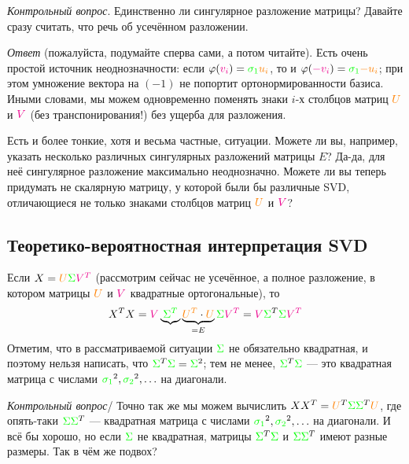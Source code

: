 \documentclass{amsart}
\theoremstyle{definition}
\theoremstyle{remark}
\numberwithin{equation}{section}
\begin{document}
\textit{Контрольный вопрос}. Единственно ли сингулярное разложение матрицы? Давайте сразу считать, что речь об усечённом разложении.

\textit{Ответ} (пожалуйста, подумайте сперва сами, а потом читайте). Есть очень простой источник неоднозначности: если $\varphi(\textcolor{magenta}{v_i}) = \textcolor{green}{\sigma_1}\textcolor{orange}{u_i}$, то и $\varphi(\textcolor{magenta}{-v_i}) = \textcolor{green}{\sigma_1}\textcolor{orange}{-u_i}$; при этом умножение вектора на $(-1)$ не попортит ортонормированности базиса. Иными словами, мы можем одновременно поменять знаки $i$-х столбцов матриц $\textcolor{orange}{U}$ и $\textcolor{magenta}{V}$ (без транспонирования!) без ущерба для разложения.

Есть и более тонкие, хотя и весьма частные, ситуации. Можете ли вы, например, указать несколько различных сингулярных разложений матрицы $E$? Да-да, для неё сингулярное разложение максимально неоднозначно. Можете ли вы теперь придумать не скалярную матрицу, у которой были бы различные SVD, отличающиеся не только знаками столбцов матриц $\textcolor{orange}{U}$ и $\textcolor{magenta}{V}$?

\subsection{Теоретико-вероятностная интерпретация SVD} Если $X =\textcolor{orange}{U}\textcolor{green}{\Sigma} \textcolor{magenta}{V^T}$ (рассмотрим сейчас не усечённое, а полное разложение, в котором матрицы $\textcolor{orange}{U}$ и $\textcolor{magenta}{V}$ квадратные ортогональные), то 
$$X^TX = \textcolor{magenta}{V}\underbrace{\textcolor{green}{\Sigma^T}}\underbrace{\textcolor{orange}{U^T}\cdot \textcolor{orange}{U}}_{=E}\textcolor{green}{\Sigma} \textcolor{magenta}{V^T} =
\textcolor{magenta}{V}\textcolor{green}{\Sigma}^T\textcolor{green}{\Sigma} \textcolor{magenta}{V^T}$$
Отметим, что в рассматриваемой ситуации $\textcolor{green}{\Sigma}$ не обязательно квадратная, и поэтому нельзя написать, что $\textcolor{green}{\Sigma}^T\textcolor{green}{\Sigma}=\textcolor{green}{\Sigma}^2$; тем не менее, $\textcolor{green}{\Sigma}^T\textcolor{green}{\Sigma}$ --- это квадратная матрица с числами $\textcolor{green}{\sigma_1}^2,\textcolor{green}{\sigma_2}^2,\ldots$ на диагонали.

\medskip

\textit{Контрольный вопрос}/ Точно так же мы можем вычислить $XX^T = \textcolor{orange}{U}^T\textcolor{green}{\Sigma}\textcolor{green}{\Sigma}^T\textcolor{orange}{U}$, где опять-таки $\textcolor{green}{\Sigma}\textcolor{green}{\Sigma}^T$ --- квадратная матрица с числами $\textcolor{green}{\sigma_1}^2,\textcolor{green}{\sigma_2}^2,\ldots$ на диагонали. И всё бы хорошо, но если $\textcolor{green}{\Sigma}$ не квадратная, матрицы $\textcolor{green}{\Sigma}^T\textcolor{green}{\Sigma}$ и $\textcolor{green}{\Sigma}\textcolor{green}{\Sigma}^T$ имеют разные размеры. Так в чём же подвох?
\end{document}
